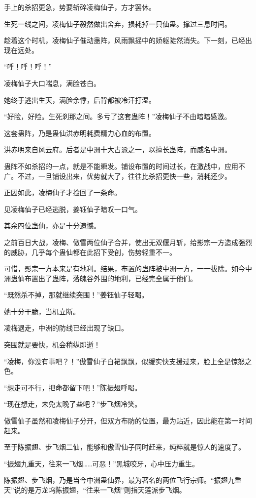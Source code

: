 \begin{this_body}
手上的杀招更急，势要斩碎凌梅仙子，方才罢休。

生死一线之间，凌梅仙子毅然做出舍弃，损耗掉一只仙蛊。撑过三息时间。

趁着这个时机，凌梅仙子催动蛊阵，风雨飘摇中的娇躯陡然消失。下一刻，已经出现在远处。

“呼！呼！呼！”

凌梅仙子大口喘息，满脸苍白。

她终于逃出生天，满脸余悸，后背都被冷汗打湿。

“好险，好险。生死刹那之间。多亏了这套蛊阵！”凌梅仙子不由暗暗感激。

这套蛊阵，乃是蛊仙洪赤明耗费精力心血的布置。

洪赤明来自风云府。后者是中洲十大古派之一，以擅长蛊阵，而威名中洲。

蛊阵不如杀招的一点，就是不能瞬发。铺设布置的时间过长，在激战中，应用不广。不过，一旦铺设出来，优势就大了，往往比杀招更快一些，消耗还少。

正因如此，凌梅仙子才捡回了一条命。

见凌梅仙子已经逃脱，姜钰仙子暗叹一口气。

其余四位蛊仙，亦是十分遗憾。

之前百日大战，凌梅、傲雪两位仙子合并，使出无双偃月斩，给影宗一方造成强烈的威胁，几乎每个蛊仙都在此招下受创，伤势轻重不一。

可惜，影宗一方本来是有地利。结果，布置的蛊阵被中洲一方，一一拔除。如今中洲蛊仙布置出了蛊阵，落魄谷外围的地利，已经完全属于他们。

“既然杀不掉，那就继续突围！”姜钰仙子轻喝。

她十分干脆，当机立断。

凌梅退走，中洲的防线已经出现了缺口。

突围就是要快，机会稍纵即逝！

“凌梅，你没有事吧？！”傲雪仙子白裙飘飘，似缓实快支援过来，脸上全是惊怒之色。

“想走可不行，把命都留下吧！”陈振翅呼喝。

“现在想走，未免太晚了些吧？”步飞烟冷笑。

傲雪仙子虽然和凌梅仙子分开，但双方布防的位置，最为贴近，因此能在第一时间赶来。

至于陈振翅、步飞烟二仙，能够和傲雪仙子同时赶来，纯粹就是惊人的速度了。

“振翅九重天，往来一飞烟……可恶！”黑城咬牙，心中压力重生。

陈振翅、步飞烟，乃是当今中洲蛊仙界，最为著名的两位飞行宗师。“振翅九重天”说的是万龙坞陈振翅，“往来一飞烟”则指天莲派步飞烟。


\end{this_body}
